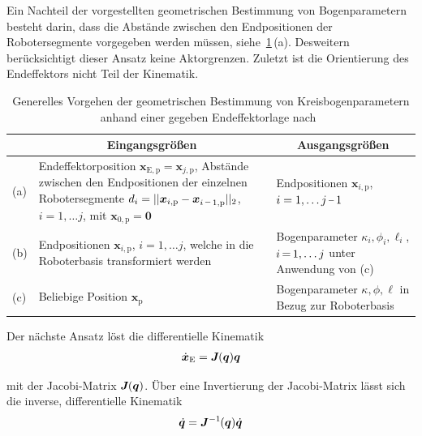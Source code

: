 Ein Nachteil der vorgestellten geometrischen Bestimmung von Bogenparametern besteht darin, dass die Abstände zwischen den Endpositionen der Robotersegmente vorgegeben werden müssen, siehe~\ref{tab:geometrischeInverseUnabhaengigeKinematik}\,(a). Desweitern berücksichtigt dieser Ansatz keine Aktorgrenzen. Zuletzt ist die Orientierung des Endeffektors nicht Teil der Kinematik. \newline

\begin{table}[htb!]
\caption[Generelles Vorgehen der geometrischen Bestimmung von Kreisbogenparametern]
{Generelles Vorgehen der geometrischen Bestimmung von Kreisbogenparametern anhand einer gegeben Endeffektorlage nach~\cite{NCJW09}}
\begin{tabular}{ l  p{7.5cm} | p{6.50cm}}
\label{tab:geometrischeInverseUnabhaengigeKinematik}	
& \multicolumn{1}{c}{Eingangsgrößen} & \multicolumn{1}{c}{Ausgangsgrößen}\\ \hline\hline
(a) & Endeffektorposition $\bm{x}_{\mathrm{E,p}} = \bm{x}_{j,\mathrm{p}}$, Abstände zwischen den Endpositionen der einzelnen Robotersegmente \mbox{$d_i = ||\bm{x}_{i,\mathrm{p}}-\bm{x}_{i\shortminus1,\mathrm{p}}||_2$,} \mbox{$i = 1, \dots j $}, mit $\bm{x}_{0,\mathrm{p}} = \bm{0}$ & Endpositionen $\bm{x}_{i,\mathrm{p}}$, $i = 1,\dots j \shortminus 1$ \\ \hline
(b) & Endpositionen $\bm{x}_{i,\mathrm{p}}$, $i = 1, \dots j$, welche in die Roboterbasis transformiert werden &  Bogenparameter $\kappa_i, \phi_i, \ell_i$, $i \,{=}\, 1,  \dots j$ unter Anwendung von (c)  \\ \hline
(c) & Beliebige Position $\bm{x}_{\mathrm{p}}$ &  Bogenparameter $\kappa, \phi, \ell$ in Bezug zur Roboterbasis \\ 
\end{tabular}
\end{table}

Der nächste Ansatz löst die differentielle Kinematik
\begin{align}
\dot{\bm{x}}_{\mathrm{E}} = \bm{J} \mkern-1mu( \bm{q} ) \bm{q}
\label{eq:differentielleKinematik}
\end{align}

mit der Jacobi-Matrix $\bm{J}\mkern-1mu (\bm{q})$. Über eine Invertierung der Jacobi-Matrix lässt sich die inverse, differentielle Kinematik 
\begin{align}
\dot{\bm{q}} = \bm{J}^{-1} \mkern-1mu( \bm{q} ) \dot{\bm{q}}
\label{eq:differentielleInverseKinematik}
\end{align}

